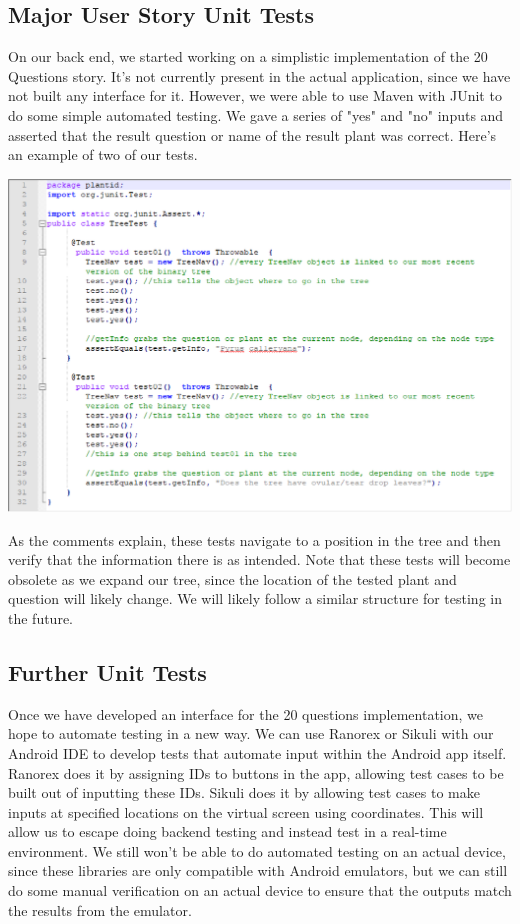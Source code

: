 \documentclass[a4paper]{article}
\begin{document}
\subsection{Major User Story Unit Tests}
On our back end, we started working on a simplistic implementation of the 20 Questions story. It's not currently present in the actual application, since we have not built any interface for it. However, we were able to use Maven with JUnit to do some simple automated testing. We gave a series of "yes" and "no" inputs and asserted that the result question or name of the result plant was correct. Here's an example of two of our tests. 
\begin{center}\includegraphics[scale=.66]{test.eps}\end{center}
As the comments explain, these tests navigate to a position in the tree and then verify that the information there is as intended. Note that these tests will become obsolete as we expand our tree, since the location of the tested plant and question will likely change. We will likely follow a similar structure for testing in the future.
\subsection{Further Unit Tests}
Once we have developed an interface for the 20 questions implementation, we hope to automate testing in a new way. We can use Ranorex or Sikuli with our Android IDE to develop tests that automate input within the Android app itself. Ranorex does it by assigning IDs to buttons in the app, allowing test cases to be built out of inputting these IDs. Sikuli does it by allowing test cases to make inputs at specified locations on the virtual screen using coordinates. This will allow us to escape doing backend testing and instead test in a real-time environment. We still won't be able to do automated testing on an actual device, since these libraries are only compatible with Android emulators, but we can still do some manual verification on an actual device to ensure that the outputs match the results from the emulator.
\end{document}
